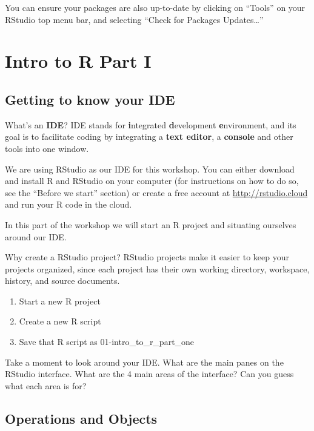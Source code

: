 \documentclass[]{book}
\providecommand{\tightlist}{%
  \setlength{\itemsep}{0pt}\setlength{\parskip}{0pt}}
\begin{document}
You can ensure your packages are also up-to-date by clicking on ``Tools'' on your RStudio top menu bar, and selecting ``Check for Packages Updates\ldots{}''

\hypertarget{parti}{%
\chapter{Intro to R Part I}\label{parti}}

\hypertarget{getting-to-know-your-ide}{%
\section{Getting to know your IDE}\label{getting-to-know-your-ide}}

\leavevmode\hypertarget{explanation}{}%
What's an \textbf{IDE}? IDE stands for \textbf{i}ntegrated \textbf{d}evelopment \textbf{e}nvironment, and its goal is to facilitate coding by integrating a \textbf{text editor}, a \textbf{console} and other tools into one window.

We are using RStudio as our IDE for this workshop. You can either download and install R and RStudio on your computer (for instructions on how to do so, see the ``Before we start'' section) or create a free account at \url{http://rstudio.cloud} and run your R code in the cloud.

In this part of the workshop we will start an R project and situating ourselves around our IDE.

\leavevmode\hypertarget{explanation}{}%
Why create a RStudio project? RStudio projects make it easier to keep your projects organized, since each project has their own working directory, workspace, history, and source documents.

\begin{enumerate}
\def\labelenumi{\arabic{enumi}.}
\tightlist
\item
  Start a new R project
\item
  Create a new R script
\item
  Save that R script as 01-intro\_to\_r\_part\_one
\end{enumerate}

\leavevmode\hypertarget{question}{}%
Take a moment to look around your IDE. What are the main panes on the RStudio interface. What are the 4 main areas of the interface? Can you guess what each area is for?

\hypertarget{operations-and-objects}{%
\section{Operations and Objects}\label{operations-and-objects}}
\end{document}
